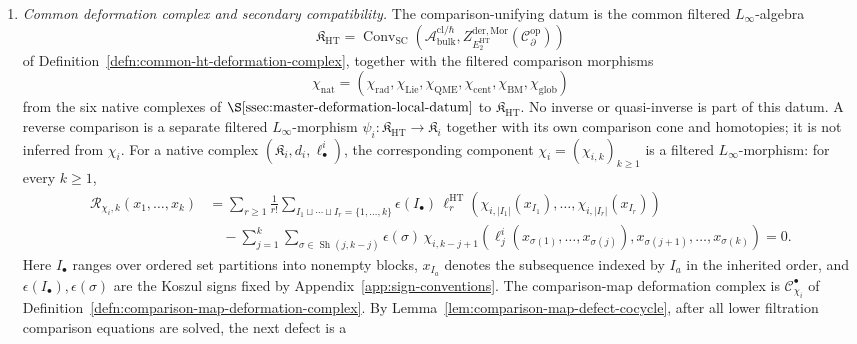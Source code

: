 \begin{defn}
\begin{enumerate}[label=\textup{(D\arabic*)}]
  \item \emph{Common deformation complex and secondary compatibility.}
    The comparison-unifying datum is the common filtered
    \(L_\infty\)-algebra
    \[
      \mathfrak K_{\mathrm{HT}}
      =
      \operatorname{Conv}_{\mathrm{SC}}\!\left(
      \mathcal A^{\mathrm{cl}/\hbar}_{\mathrm{bulk}},
      Z^{\mathrm{der},\mathrm{Mor}}_{E_2^{\mathrm{HT}}}
      (\mathcal C^{\mathrm{op}}_\partial)\right)
    \]
    of Definition~\ref{defn:common-ht-deformation-complex}, together
    with the filtered comparison morphisms
    \[
      \chi_{\mathrm{nat}}
      =
      (\chi_{\mathrm{rad}},\chi_{\mathrm{Lie}},\chi_{\mathrm{QME}},
       \chi_{\mathrm{cent}},\chi_{\mathrm{BM}},\chi_{\mathrm{glob}})
    \]
    from the six native complexes of
    \(\S\ref{ssec:master-deformation-local-datum}\) to
    \(\mathfrak K_{\mathrm{HT}}\).  No inverse or quasi-inverse is part of
    this datum.  A reverse comparison is a separate filtered
    \(L_\infty\)-morphism
    \(\psi_i\colon\mathfrak K_{\mathrm{HT}}\to\mathfrak K_i\) together
    with its own comparison cone and homotopies; it is not inferred from
    \(\chi_i\).  For a native complex
    \((\mathfrak K_i,d_i,\ell^i_\bullet)\), the corresponding component
    \(\chi_i=(\chi_{i,k})_{k\ge1}\) is a filtered \(L_\infty\)-morphism:
    for every \(k\ge1\),
    \[
    \begin{aligned}
      \mathcal R_{\chi_i,k}(x_1,\ldots,x_k)
      &=
      \sum_{r\ge1}\frac1{r!}
      \sum_{I_1\sqcup\cdots\sqcup I_r=\{1,\ldots,k\}}
      \epsilon(I_\bullet)\,
      \ell^{\mathrm{HT}}_{r}\!\left(
        \chi_{i,|I_1|}(x_{I_1}),\ldots,
        \chi_{i,|I_r|}(x_{I_r})\right)  \\
      &\quad
      -
      \sum_{j=1}^{k}
      \sum_{\sigma\in\operatorname{Sh}(j,k-j)}
      \epsilon(\sigma)\,
      \chi_{i,k-j+1}\!\left(
        \ell^i_j(x_{\sigma(1)},\ldots,x_{\sigma(j)}),
        x_{\sigma(j+1)},\ldots,x_{\sigma(k)}\right)
      =
      0 .
    \end{aligned}
    \]
    Here \(I_\bullet\) ranges over ordered set partitions into nonempty
    blocks, \(x_{I_a}\) denotes the subsequence indexed by \(I_a\) in the
    inherited order, and \(\epsilon(I_\bullet),\epsilon(\sigma)\) are the
    Koszul signs fixed by Appendix~\ref{app:sign-conventions}.  The
    comparison-map deformation complex is
    \(\mathcal C^\bullet_{\chi_i}\) of
    Definition~\ref{defn:comparison-map-deformation-complex}.  By
    Lemma~\ref{lem:comparison-map-defect-cocycle}, after all lower
    filtration comparison equations are solved, the next defect is a

\end{enumerate}
\end{defn}

